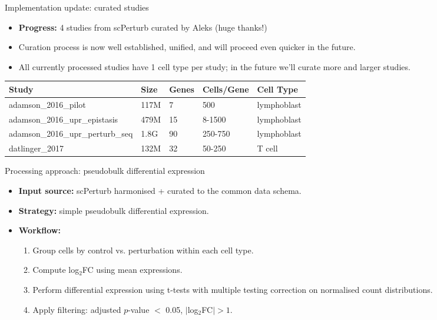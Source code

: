\documentclass[handout]{beamer}
\begin{document}
\begin{frame}{Implementation update: curated studies}
    \begin{itemize}
        \item \textbf{Progress:} 4 studies from scPerturb curated by Aleks (huge thanks!)
        \item Curation process is now well established, unified, and will proceed even quicker in the future.
        \item All currently processed studies have 1 cell type per study; in the future we'll curate more and larger studies.
    \end{itemize}
    
    \vspace{0.5em}
    \fontsize{8}{9}\selectfont
    \begin{tabular}{@{}p{4.0cm}p{1cm}p{1.0cm}p{1.5cm}p{1.5cm}@{}}
        \toprule
        \textbf{Study} & \textbf{Size} & \textbf{Genes} & \textbf{Cells/Gene} & \textbf{Cell Type} \\
        \midrule
        adamson\_2016\_pilot & 117M & 7 & 500 & lymphoblast \\
        adamson\_2016\_upr\_epistasis & 479M & 15 & 8-1500 & lymphoblast \\
        adamson\_2016\_upr\_perturb\_seq & 1.8G & 90 & 250-750 & lymphoblast \\
        datlinger\_2017 & 132M & 32 & 50-250 & T cell \\
        \bottomrule
    \end{tabular}
\end{frame}

\begin{frame}{Processing approach: pseudobulk differential expression}
    \begin{itemize}
        \item \textbf{Input source:} scPerturb harmonised + curated to the common data schema.
        \item \textbf{Strategy:} simple pseudobulk differential expression.
        \item \textbf{Workflow:}
        \begin{enumerate}
            \item Group cells by control vs. perturbation within each cell type.
            \item Compute log$_2$FC using mean expressions.
            \item Perform differential expression using t-tests with multiple testing correction on normalised count distributions.
            \item Apply filtering: adjusted $p$-value $<$ 0.05, $\lvert$log$_2$FC$\rvert > 1$.
        \end{enumerate}
    \end{itemize}
\end{frame}
\end{document}
